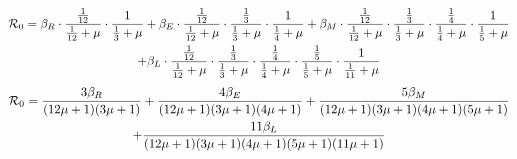 \documentclass[12pt]{article}\usepackage[]{graphicx}\usepackage[]{color}
\begin{document}
\begin{enumerate}[(a)]
\begin{multline}\label{eq:pareto mle2}
{\cal R}_0 = \beta_R \cdot \frac{\frac{1}{12}}{\frac{1}{12}+\mu}\cdot\frac{1}{\frac{1}{3}+\mu}+\beta_E \cdot \frac{\frac{1}{12}}{\frac{1}{12}+\mu}\cdot\frac{\frac{1}{3}}{\frac{1}{3}+\mu}\cdot\frac{1}{\frac{1}{4}+\mu}+\beta_M \cdot \frac{\frac{1}{12}}{\frac{1}{12}+\mu}\cdot\frac{\frac{1}{3}}{\frac{1}{3}+\mu}\cdot\frac{\frac{1}{4}}{\frac{1}{4}+\mu}\cdot\frac{1}{\frac{1}{5}+\mu} \\ +\beta_L \cdot \frac{\frac{1}{12}}{\frac{1}{12}+\mu}\cdot\frac{\frac{1}{3}}{\frac{1}{3}+\mu}\cdot\frac{\frac{1}{4}}{\frac{1}{4}+\mu}\cdot\frac{\frac{1}{5}}{\frac{1}{5}+\mu}\cdot\frac{1}{\frac{1}{11}+\mu}
\end{multline}
\begin{multline}\label{R01}
{\cal R}_0 =  \frac{3\beta_R}{(12 \mu + 1)(3 \mu + 1)} + \frac{4\beta_E}{(12 \mu + 1)(3 \mu + 1)  (4 \mu + 1)} +\frac{5\beta_M}{(12 \mu + 1)(3 \mu + 1)  (4 \mu + 1) (5 \mu + 1)} \\
+ \frac{11 \beta_L}{(12 \mu + 1)(3 \mu + 1)  (4 \mu + 1) (5 \mu + 1)(11\mu+1)}
\end{multline}



\end{enumerate}
\end{document}
